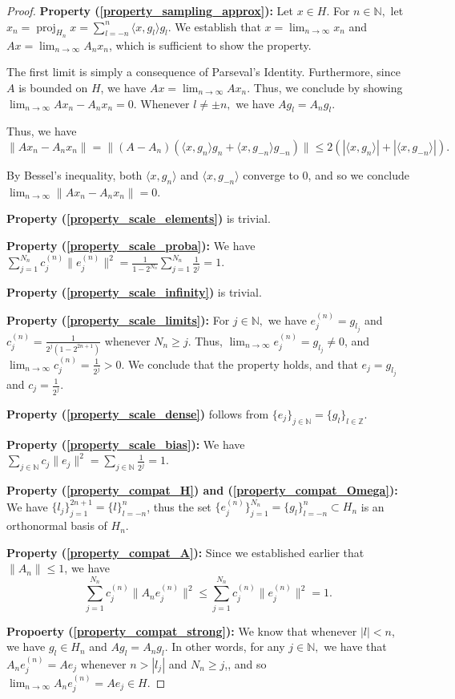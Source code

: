 \documentclass{amsart}
\theoremstyle{definition}
\theoremstyle{remark}
\def \Proj{\operatorname{proj}}
\def \LL{\langle}
\def \RR{\rangle}
\begin{document}
\begin{proof}
	\textbf{Property (\ref{property_sampling_approx}):} Let $x\in H.$ For $n\in\mathbb{N},$  let $x_n=\Proj_{H_n}x=\sum_{l=-n}^n \LL x, g_l\RR g_l.$ We establish that $x=\lim_{n\rightarrow\infty} x_n$ and $Ax=\lim_{n\rightarrow\infty} A_n x_n$, which is sufficient to show the property.
	
	The first limit is simply a consequence of Parseval's Identity. Furthermore, since $A$ is bounded on $H$, we have $Ax=\lim_{n\rightarrow\infty} Ax_n.$ Thus, we conclude by showing $\lim_{n\rightarrow\infty} Ax_n-A_nx_n=0$. Whenever $l\neq\pm n,$ we have $A g_l= A_n g_l.$ 
	
	Thus, we have $$\|Ax_n-A_nx_n\|=\|(A-A_n)(\LL x, g_n\RR g_n+\LL x, g_{-n}\RR g_{-n})\|\leq 2(|\LL x, g_n\RR|+|\LL x, g_{-n}\RR|).$$ 
	
	By Bessel's inequality, both $\LL x, g_n\RR$ and $\LL x, g_{-n}\RR$ converge to $0$, and so we conclude $\lim_{n\rightarrow\infty}\|Ax_n-A_nx_n\|=0.$
	
	\textbf{Property (\ref{property_scale_elements})} is trivial.
	
	\textbf{Property (\ref{property_scale_proba}):} We have $\sum_{j=1}^{N_n}c_j^{(n)}\|e_j^{(n)}\|^2=\frac{1}{1-2^{N_n}}\sum_{j=1}^{N_n}\frac{1}{2^j}=1.$
	
	\textbf{Property (\ref{property_scale_infinity})} is trivial.
	
	\textbf{Property (\ref{property_scale_limits}):} For $j\in \mathbb{N},$  we have $e_j^{(n)}=g_{l_j}$ and $c_j^{(n)}=\frac{1}{2^j(1-2^{2n+1})}$ whenever $N_n\geq j$. Thus, $\lim_{n\rightarrow\infty}e_j^{(n)}=g_{l_j}\neq 0$, and $\lim_{n\rightarrow\infty}c_j^{(n)}=\frac{1}{2^j}>0.$ We conclude that the property holds, and that $e_j=g_{l_j}$ and $c_j=\frac{1}{2^j}.$  
	
	\textbf{Property (\ref{property_scale_dense})} follows from $\{e_j\}_{j\in\mathbb{N}}=\{ g_l\}_{l\in \mathbb{Z}}.$
	
	\textbf{Property (\ref{property_scale_bias}):} We have $\sum_{j\in\mathbb{N}} c_j\|e_j\|^2=\sum_{j\in\mathbb{N}}\frac{1}{2^j}=1.$
	
	\textbf{Property (\ref{property_compat_H}) and (\ref{property_compat_Omega}):} We have  $\{l_j\}_{j=1}^{2n+1}=\{l\}_{l=-n}^n$, thus the set  $\{e_j^{(n)}\}_{j=1}^{N_n}=\{g_l\}_{l=-n}^n\subset H_n$ is an orthonormal basis of $H_n.$
	
	\textbf{Property (\ref{property_compat_A}):} Since we established earlier that $\|A_n\|\leq 1$, we have $$\sum_{j=1}^{N_n}c_j^{(n)}\|A_ne_j^{(n)}\|^2\leq\sum_{j=1}^{N_n}c_j^{(n)}\|e_j^{(n)}\|^2=1.$$
	
	\textbf{Propoerty (\ref{property_compat_strong}):} We know that whenever $|l|<n$, we have $g_l\in H_n$ and $A g_l=A_n g_l.$ In other words, for any $j\in\mathbb{N},$ we have that $A_n e_j^{(n)}=A e_j$ whenever  $n>|l_j|$ and $N_n\geq j$,, and so $\lim_{n\rightarrow\infty} A_ne_j^{(n)}=Ae_j\in H.$
\end{proof}
\end{document}
